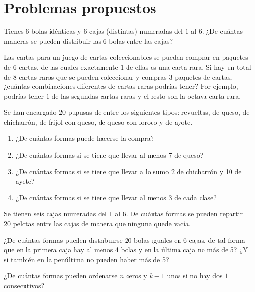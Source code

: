 \section{Problemas propuestos}
\begin{problema}
Tienes $6$ bolas idénticas y $6$ cajas (distintas) numeradas del $1$ al $6$. ¿De cuántas maneras se pueden distribuir las $6$ bolas entre las cajas?
\end{problema}
\begin{problema}
Las cartas para un juego de cartas coleccionables se pueden comprar en paquetes de $6$ cartas, de las cuales exactamente $1$ de ellas es una carta rara. Si hay un total de $8$ cartas raras que se pueden coleccionar y compras $3$ paquetes de cartas, ¿cuántas combinaciones diferentes de cartas raras podrías tener? Por ejemplo, podrías tener $1$ de las segundas cartas raras y el resto son la octava carta rara.
\end{problema}

\begin{problema}
Se han encargado $20$ pupusas de entre los siguientes tipos: revueltas, de queso, de chicharrón, de frijol con queso, de queso con loroco y de ayote.
\begin{enumerate}
    \item ¿De cuántas formas puede hacerse la compra?
    \item ¿De cuántas formas si se tiene que llevar al menos $7$ de queso?
    \item ¿De cuántas formas si se tiene que llevar a lo sumo $2$ de chicharrón y 10 de ayote?
    \item ¿De cuántas formas si se tiene que llevar al menos $3$ de cada clase?
\end{enumerate}
\end{problema}

\begin{problema}
Se tienen seis cajas numeradas del $1$ al $6$. De cuántas formas se pueden repartir $20$ pelotas entre las cajas de manera que ninguna quede vacía.
\end{problema}

\begin{problema}
¿De cuántas formas pueden distribuirse 20 bolas iguales en 6 cajas, de tal forma que en la primera caja hay al menos 4 bolas y en la última caja no más de 5? ¿Y si también en la penúltima no pueden haber más de 5?
\end{problema}

\begin{problema}
¿De cuántas formas pueden ordenarse $n$ ceros y $k-1$ unos si no hay dos $1$ consecutivos?
\end{problema} 

